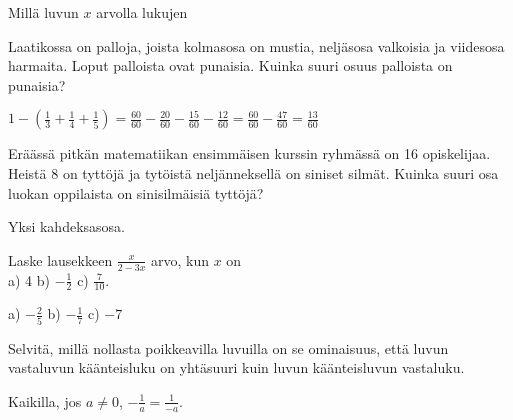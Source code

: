 \begin{tehtavasivu}
\begin{tehtava}
Millä luvun $x$ arvolla lukujen 
\begin{alakohdat}
\end{alakohdat}
\begin{vastaus}
\begin{alakohdat}
\end{alakohdat}
\end{vastaus}
\end{tehtava}

\begin{tehtava} 
        Laatikossa on palloja, joista kolmasosa on mustia, neljäsosa
        valkoisia ja viidesosa harmaita. Loput palloista ovat punaisia.
        Kuinka suuri osuus palloista on punaisia?
        
        \begin{vastaus}
            $1-(\frac{1}{3}+\frac{1}{4}+\frac{1}{5})
            = \frac{60}{60}-\frac{20}{60}-\frac{15}{60}-\frac{12}{60}
            = \frac{60}{60}-\frac{47}{60}
            = \frac{13}{60}$
        \end{vastaus}
    \end{tehtava}
    
\begin{tehtava} 
Eräässä pitkän matematiikan ensimmäisen kurssin ryhmässä on 16 opiskelijaa. Heistä 8 on tyttöjä ja tytöistä neljänneksellä on siniset silmät. Kuinka suuri osa luokan oppilaista on sinisilmäisiä tyttöjä?
        \begin{vastaus}
			Yksi kahdeksasosa.
        \end{vastaus}
\end{tehtava}

\begin{tehtava}
Laske lausekkeen $\frac{x}{2-3x}$ arvo, kun $x$ on \\ a) 4 \qquad b) $-\frac{1}{2}$ \qquad c) $\frac{7}{10}$.
\begin{vastaus}
a) $-\frac{2}{5}$ \qquad b) $-\frac{1}{7}$ \qquad c) $-7$
\end{vastaus}
\end{tehtava}

\begin{tehtava}
Selvitä, millä nollasta poikkeavilla luvuilla on se ominaisuus, että luvun vastaluvun käänteisluku on yhtäsuuri kuin luvun käänteisluvun vastaluku.
\begin{vastaus}
Kaikilla, jos $a \neq 0$, $-\frac{1}{a} = \frac{1}{-a}$.
\end{vastaus}
\end{tehtava}


\end{tehtavasivu}
